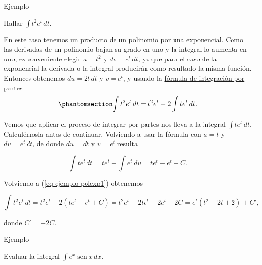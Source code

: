\documentclass[
  letterpaper,
]{book}
\theoremstyle{plain}
\theoremstyle{remark}
\begin{document}
Ejemplo

Hallar \(\displaystyle \int t^2e^t\,dt\).

\begin{tcolorbox}[enhanced jigsaw, opacityback=0, left=2mm, opacitybacktitle=0.6, toprule=.15mm, bottomrule=.15mm, colbacktitle=quarto-callout-tip-color!10!white, titlerule=0mm, bottomtitle=1mm, title=\textcolor{quarto-callout-tip-color}{\faLightbulb}\hspace{0.5em}{Solución}, toptitle=1mm, colframe=quarto-callout-tip-color-frame, colback=white, breakable, rightrule=.15mm, arc=.35mm, leftrule=.75mm, coltitle=black]

En este caso tenemos un producto de un polinomio por una exponencial.
Como las derivadas de un polinomio bajan su grado en uno y la integral
lo aumenta en uno, es conveniente elegir \(u=t^2\) y \(dv=e^t\,dt\), ya
que para el caso de la exponencial la derivada o la integral producirán
como resultado la misma función. Entonces obtenemos \(du=2t\,dt\) y
\(v=e^t\), y usando la \hyperref[form-partes2]{fórmula de integración
por partes} \begin{equation}\phantomsection\label{eq-ejemplo-polexp1}{
\int t^2e^t\,dt=t^2e^t-2\int te^t\,dt.
}\end{equation}

Vemos que aplicar el proceso de integrar por partes nos lleva a la
integral \(\int te^t\,dt\). Calculémosla antes de continuar. Volviendo a
usar la fórmula con \(u=t\) y \(dv=e^t\,dt\), de donde \(du=dt\) y
\(v=e^t\) resulta

\[
\int t e^t\,dt=te^t-\int e^t\,du=te^t-e^t+C.
\]

Volviendo a (\ref{eq-ejemplo-polexp1}) obtenemos

\[
\int t^2e^t\,dt=t^2e^t-2\left(te^t-e^t+C\right)=t^2e^t-2te^t+2e^t-2C=e^t(t^2-2t+2)+C',
\]

donde \(C'=-2C\).

\end{tcolorbox}

Ejemplo

Evaluar la integral \(\displaystyle \int e^x\operatorname{sen} x\,dx\).
\end{document}

